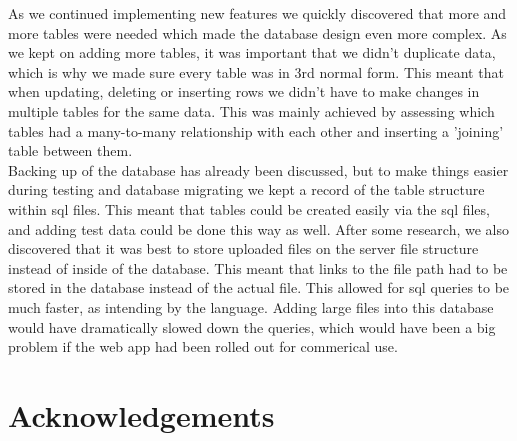 \documentclass{article}
\begin{document}
As we continued implementing new features we quickly discovered that more and more tables were needed which made the database design even more complex. As we kept on adding more tables, it was important that we didn't duplicate data, which is why we made sure every table was in 3rd normal form. This meant that when updating, deleting or inserting rows we didn't have to make changes in multiple tables for the same data. This was mainly achieved by assessing which tables had a many-to-many relationship with each other and inserting a 'joining' table between them. \\
Backing up of the database has already been discussed, but to make things easier during testing and database migrating we kept a record of the table structure within sql files. This meant that tables could be created easily via the sql files, and adding test data could be done this way as well.
After some research, we also discovered that it was best to store uploaded files on the server file structure instead of inside of the database. This meant that links to the file path had to be stored in the database instead of the actual file. This allowed for sql queries to be much faster, as intending by the language. Adding large files into this database would have dramatically slowed down the queries, which would have been a big problem if the web app had been rolled out for commerical use.
\section{Acknowledgements}
\end{document}
